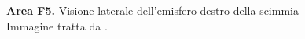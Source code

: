 \begin{figure}[htbp]
	\centering

	\caption{\textbf{Area F5.}
	Visione laterale dell'emisfero destro della scimmia 
	Immagine tratta da \citep{fadiga.craighero:2003}.}
	\label{fig:empty}
\end{figure}
